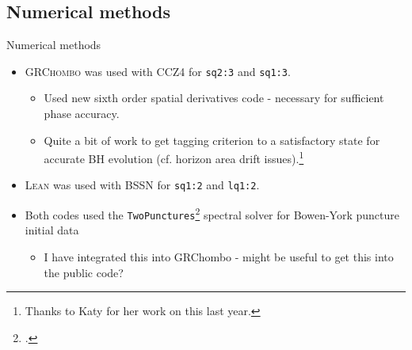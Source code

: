 \documentclass[smaller,aspectratio=169]{beamer}
\begin{document}
\subsection{Numerical methods}
\begin{frame}{Numerical methods}
    \begin{itemize}
        \item 
            \textsc{GRChombo} was used with \alert{CCZ4} for 
            \texttt{sq2:3} and \texttt{sq1:3}.
            \begin{itemize}
                \item 
                    Used new \alert{sixth order spatial derivatives} code 
                    - necessary for sufficient phase accuracy.
                \item
                    Quite a bit of work to get tagging criterion to a satisfactory
                    state for accurate BH evolution (cf. horizon area 
                    drift issues).\footnote{Thanks to 
                    Katy for her work on this last year.}
            \end{itemize}
        \item
            \textsc{Lean} was used with \alert{BSSN} for \texttt{sq1:2} and \texttt{lq1:2}.
        \item
            Both codes used the \texttt{TwoPunctures}\footcite{Ansorg:2004ds} 
            spectral solver for \alert{Bowen-York puncture} initial data
            \begin{itemize}
                \item 
                    I have integrated this into GRChombo - might be useful 
                    to get this into the public code?
            \end{itemize}
    \end{itemize}
\end{frame}
\end{document}
